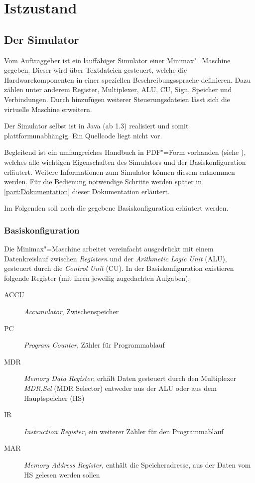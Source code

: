 \chapter{Istzustand}
\label{chapter:Pflichtenheft-Istzustand}

\section{Der Simulator}
\label{section:Pflichtenheft-Istzustand-Simulator}

Vom Auftraggeber ist ein lauffähiger Simulator einer Minimax"=Maschine gegeben. Dieser wird über Textdateien gesteuert, welche die Hardwarekomponenten in einer speziellen Beschreibungssprache definieren. Dazu zählen unter anderem Register, Multiplexer, ALU, CU, Sign, Speicher und Verbindungen. Durch hinzufügen weiterer Steuerungsdateien lässt sich die virtuelle Maschine erweitern.

Der Simulator selbst ist in Java (ab 1.3) realisiert und somit plattformunabhängig. Ein Quellcode liegt nicht vor.

Begleitend ist ein umfangreiches Handbuch in PDF"=Form vorhanden (siehe \cite{minimax-handbuch}), welches alle wichtigen Eigenschaften des Simulators und der Basiskonfiguration erläutert. Weitere Informationen zum Simulator können diesem entnommen werden. Für die Bedienung notwendige Schritte werden später in \autoref{part:Dokumentation} dieser Dokumentation erläutert.

Im Folgenden soll noch die gegebene Basiskonfiguration erläutert werden.

\subsection{Basiskonfiguration}
\label{subsection:Pflichtenheft-Istzustand-Simulator-Basiskonfiguration}

Die Minimax"=Maschine arbeitet vereinfacht ausgedrückt mit einem Datenkreislauf zwischen \emph{Registern} und der \emph{Arithmetic Logic Unit} (ALU), gesteuert durch die \emph{Control Unit} (CU). In der Basiskonfiguration existieren folgende Register (mit ihren jeweilig zugedachten Aufgaben):

\begin{description}
    \item[ACCU] \emph{Accumulator}, Zwischenspeicher
    \item[PC] \emph{Program Counter}, Zähler für Programmablauf
    \item[MDR] \emph{Memory Data Register}, erhält Daten gesteuert durch den Multiplexer \emph{MDR.Sel} (MDR Selector) entweder aus der ALU oder aus dem Hauptspeicher (HS)
    \item[IR] \emph{Instruction Register}, ein weiterer Zähler für den Programmablauf
    \item[MAR] \emph{Memory Address Register}, enthält die Speicheradresse, aus der Daten vom HS gelesen werden sollen
\end{description}

